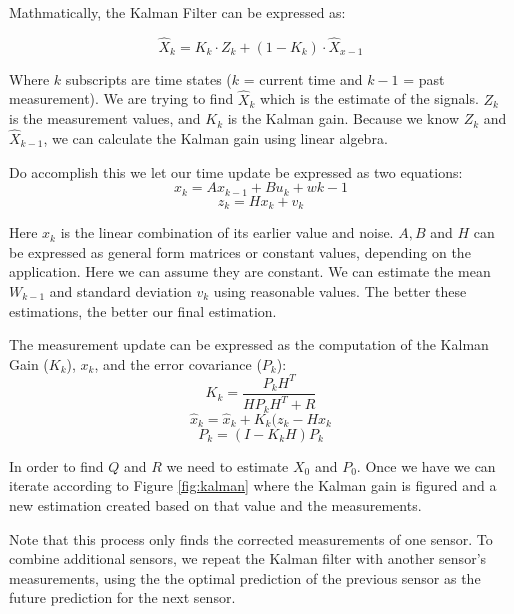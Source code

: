 \documentclass{acm_proc_article-sp}
\begin{document}
Mathmatically, the Kalman Filter can be expressed as:

$$  \hat{X}_k = K_k \cdot Z_k + (1-K_k) \cdot \hat{X}_{x-1}  $$

Where $k$ subscripts are time states ($k$ = current time and $k-1$ = past measurement).  We are trying to find $\hat{X}_k$ which is the 
estimate of the signals.  $Z_k$ is the measurement values, and $K_k$ is the Kalman gain.  Because we know $Z_k$ and $\hat{X}_{k-1}$, we can calculate the Kalman gain using linear algebra.\cite{brooks1998multi} \cite{klein2004sensor}

Do accomplish this we let our time update be expressed as two equations: $$ x_k = Ax_{k-1} + Bu_k + w{k-1}$$ $$z_k = Hx_k + v_k $$

Here $x_k$ is the linear combination of its earlier value and noise.  $A, B$ and $H$ can be expressed as general form matrices or constant values, depending on the application.\cite{klein2004sensor}  Here we can assume they are constant.  We can estimate the mean $W_{k-1}$ and standard deviation $v_k$ using reasonable values.  The better these estimations, the better our final estimation.\cite{brooks1998multi} 

The measurement update can be expressed as the computation of the Kalman Gain ($K_k$),  $x_k$, and the error covariance ($P_k$):
$$ K_k = \frac{P_kH^T}{HP_kH^T+R}$$ $$ \hat{x}_k = \hat{x}_k + K_k(z_k-H\hat{x_k} $$ $$P_k = (I-K_kH)P_k $$

In order to find $Q$ and $R$ we need to estimate $X_0$ and $P_0$.  Once we have we can iterate according to Figure \ref{fig:kalman} where the Kalman gain is figured and a new estimation created based on that value and the measurements. \cite{welch1995introduction}

Note that this process only finds the corrected measurements of one sensor.  To combine additional sensors, we repeat the Kalman filter with another sensor's measurements, using the the optimal prediction of the previous sensor as the future prediction for the next sensor.\cite{klein2004sensor}\cite{welch1995introduction}
\end{document}
